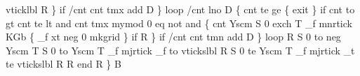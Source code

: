 \documentclass[11pt]{article}
\begin{document}
              vticklbl   %
            R            %
          \} if           %
          /cnt           %
            cnt tmx add  %
          D              %
         \} loop          %
        /cnt             %
          lno            %
        D                %
        \{                %
          cnt te ge \{    %
            exit         %
          \} if           %
          cnt to gt      %
          cnt te lt      %
          and            %
          cnt tmx mymod  %
          0 eq not       %
          and \{          %
            cnt Yscm     %
            S            %
              0 exch T       %
              _f mnrtick     %
              KGb \{          %
                _f xt neg 0  %
                     mkgrid  %
              \} if           %
            R            %
          \} if           %
          /cnt           %
            cnt tmn add  %
          D              %
        \} loop           %
      R                  %
      S                  %
        0 to neg Yscm T  %
        S                %
          0 to Yscm T    %
          _f mjrtick     %
          _f to vtickslbl  %
        R                %
        S                %
          0 te Yscm T    %
          _f mjrtick     %
          _t te vtickslbl  %
        R                %
      R                  %
    end                  %
  R                      %
\} B                      %
\eatline
\end{document}
